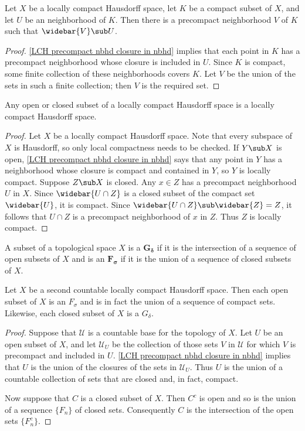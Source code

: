 \begin{proposition}\label{LCH precompact nbhd for compact set}
Let $X$ be a locally compact Hausdorff space, let $K$ be a compact subset of $X$, and let $U$ be an neighborhood of $K$. Then there is a precompact neighborhood $V$ of $K$ such that $\widebar{V}\sub U$.
\end{proposition}
\begin{proof}
\cref{LCH precompact nbhd closure in nbhd} implies that each point in $K$ has a precompact neighborhood whose closure is included in $U$. Since $K$ is compact, some finite collection of these neighborhoods covers $K$. Let $V$ be the union of the sets in such a finite collection; then $V$ is the required set.
\end{proof}
\begin{proposition}
Any open or closed subset of a locally compact Hausdorff space is a locally compact Hausdorff space.
\end{proposition}
\begin{proof}
Let $X$ be a locally compact Hausdorff space. Note that every subspace of $X$ is Hausdorff, so only local compactness needs to be checked. If $Y\sub X$ is open, \cref{LCH precompact nbhd closure in nbhd} says that any point in $Y$ has a neighborhood whose closure is compact and contained in $Y$, so $Y$ is locally compact. Suppose $Z\sub X$ is closed. Any $x\in Z$ has a precompact neighborhood $U$ in $X$. Since $\widebar{U\cap Z}$ is a closed subset of the compact set $\widebar{U}$, it is compact. Since $\widebar{U\cap Z}\sub\widebar{Z}=Z$, it follows that $U\cap Z$ is a precompact neighborhood of $x$ in $Z$. Thus $Z$ is locally compact.
\end{proof}
A subset of a topological space $X$ is a $\bm{G_{\delta}}$ if it is the intersection of a sequence of open subsets of $X$ and is an $\bm{F_{\sigma}}$ if it is the union of a sequence of closed subsets of $X$.
\begin{proposition}\label{LCH second countable space G_delta}
Let $X$ be a second countable locally compact Hausdorff space. Then each open subset of $X$ is an $F_\sigma$ and is in fact the union of a sequence of compact sets. Likewise, each closed subset of $X$ is a $G_\delta$.
\end{proposition}
\begin{proof}
Suppose that $\mathcal{U}$ is a countable base for the topology of $X$. Let $U$ be an open subset of $X$, and let $\mathcal{U}_U$ be the collection of those sets $V$ in $\mathcal{U}$ for which $V$ is precompact and included in $U$. \cref{LCH precompact nbhd closure in nbhd} implies that $U$ is the union of the closures of the sets in $\mathcal{U}_U$. Thus $U$ is the union of a countable collection of sets that are closed and, in fact, compact.\par
Now suppose that $C$ is a closed subset of $X$. Then $C^c$ is open and so is the union of a sequence $\{F_n\}$ of closed sets. Consequently $C$ is the intersection of the open sets $\{F_n^c\}$.
\end{proof}
